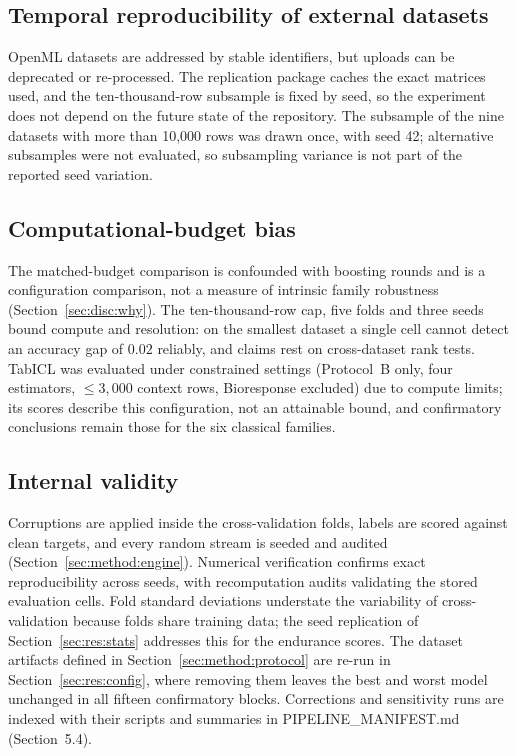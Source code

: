 \documentclass[pdflatex,sn-mathphys]{sn-jnl}
\theoremstyle{thmstyleone}
\theoremstyle{thmstyletwo}
\theoremstyle{thmstylethree}
\begin{document}
\subsection{Temporal reproducibility of external datasets}\label{sec:threats:temporal}
OpenML datasets are addressed by stable identifiers, but uploads can be deprecated or re-processed. The replication package caches the exact matrices used, and the ten-thousand-row subsample is fixed by seed, so the experiment does not depend on the future state of the repository. The subsample of the nine datasets with more than 10{,}000 rows was drawn once, with seed 42; alternative subsamples were not evaluated, so subsampling variance is not part of the reported seed variation.

\subsection{Computational-budget bias}\label{sec:threats:budget}
The matched-budget comparison is confounded with boosting rounds and is a configuration comparison, not a measure of intrinsic family robustness (Section~\ref{sec:disc:why}). The ten-thousand-row cap, five folds and three seeds bound compute and resolution: on the smallest dataset a single cell cannot detect an accuracy gap of $0.02$ reliably, and claims rest on cross-dataset rank tests. TabICL was evaluated under constrained settings (Protocol~B only, four estimators, $\le 3{,}000$ context rows, Bioresponse excluded) due to compute limits; its scores describe this configuration, not an attainable bound, and confirmatory conclusions remain those for the six classical families.

\subsection{Internal validity}\label{sec:threats:internal}
Corruptions are applied inside the cross-validation folds, labels are scored against clean targets, and every random stream is seeded and audited (Section~\ref{sec:method:engine}). Numerical verification confirms exact reproducibility across seeds, with recomputation audits validating the stored evaluation cells. Fold standard deviations understate the variability of cross-validation because folds share training data; the seed replication of Section~\ref{sec:res:stats} addresses this for the endurance scores. The dataset artifacts defined in Section~\ref{sec:method:protocol} are re-run in Section~\ref{sec:res:config}, where removing them leaves the best and worst model unchanged in all fifteen confirmatory blocks. Corrections and sensitivity runs are indexed with their scripts and summaries in PIPELINE\_MANIFEST.md (Section~5.4).
\end{document}
